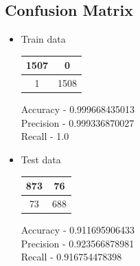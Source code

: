 \documentclass[12pt]{article}
\begin{document}
\subsection{Confusion Matrix}
\begin{itemize}
	\item Train data
\begin{center}
	\begin{tabular}{|c|c|}
		\hline 
		1507 &0 	\\
		\hline
		1    & 1508  	\\
		\hline
	\end{tabular}
\end{center}
Accuracy - 0.999668435013\\
Precision - 0.999336870027\\
Recall - 1.0\\
\clearpage
	\item Test data
\begin{center}
	\begin{tabular}{|c|c|}
		\hline 
		873&76	\\
		\hline
		73&688	\\
		\hline
	\end{tabular}
\end{center}
Accuracy - 0.911695906433\\
Precision - 0.923566878981\\
Recall - 0.916754478398\\

\end{itemize}
\end{document}
